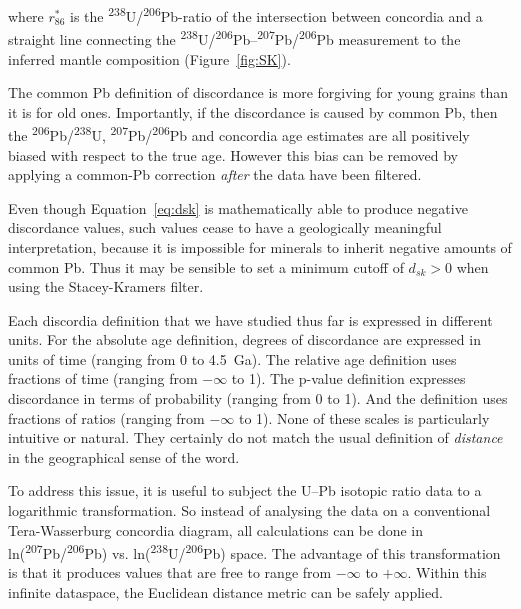 \documentclass[gchron, manuscript]{copernicus}
\begin{document}
\noindent where $r_{86}^\ast$ is the
\textsuperscript{238}U/\textsuperscript{206}Pb-ratio of the
intersection between concordia and a straight line connecting the
\textsuperscript{238}U/\textsuperscript{206}Pb--\textsuperscript{207}Pb/\textsuperscript{206}Pb
measurement to the inferred mantle composition (Figure~\ref{fig:SK}).

The common Pb definition of discordance is more forgiving for young
grains than it is for old ones. Importantly, if the discordance is
caused by common Pb, then the
\textsuperscript{206}Pb/\textsuperscript{238}U,
\textsuperscript{207}Pb/\textsuperscript{206}Pb and concordia age
estimates are all positively biased with respect to the true
age. However this bias can be removed by applying a common-Pb
correction \emph{after} the data have been filtered.

Even though Equation~\ref{eq:dsk} is mathematically able to produce
negative discordance values, such values cease to have a geologically
meaningful interpretation, because it is impossible for minerals to
inherit negative amounts of common Pb. Thus it may be sensible to set
a minimum cutoff of $d_{sk}>0$ when using the Stacey-Kramers filter.

Each discordia definition that we have studied thus far is expressed
in different units. For the absolute age definition, degrees of
discordance are expressed in units of time (ranging from 0 to
4.5~Ga). The relative age definition uses fractions of time (ranging
from $-\infty$ to 1). The p-value definition expresses discordance in
terms of probability (ranging from 0 to 1). And the \citet{stacey1975}
definition uses fractions of ratios (ranging from $-\infty$ to
1). None of these scales is particularly intuitive or natural. They
certainly do not match the usual definition of \emph{distance} in the
geographical sense of the word.

To address this issue, it is useful to subject the U--Pb isotopic
ratio data to a logarithmic transformation. So instead of analysing
the data on a conventional Tera-Wasserburg concordia diagram, all
calculations can be done in
ln(\textsuperscript{207}Pb/\textsuperscript{206}Pb) vs.
ln(\textsuperscript{238}U/\textsuperscript{206}Pb) space. The
advantage of this transformation is that it produces values that are
free to range from $-\infty$ to $+\infty$. Within this infinite
dataspace, the Euclidean distance metric can be safely applied.
\end{document}

